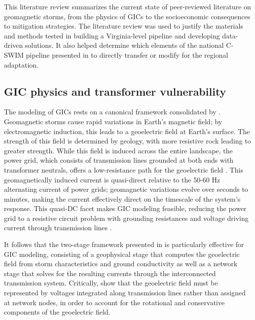 \documentclass[draft]{agujournal2019}
\begin{document}
This literature review summarizes the current state of peer-reviewed literature on geomagnetic storms, from the physics of GICs to the socioeconomic consequences to mitigation strategies. The literature review was used to justify the materials and methods tested in building a Virginia-level pipeline and developing data-driven solutions. It also helped determine which elements of the national C-SWIM pipeline presented in  to directly transfer or modify for the regional adaptation. 

\subsection{GIC physics and transformer vulnerability}

The modeling of GICs rests on a canonical framework consolidated by . Geomagnetic storms cause rapid variations in Earth's magnetic field; by electromagnetic induction, this leads to a geoelectric field at Earth's surface. The strength of this field is determined by geology, with more resistive rock leading to greater strength. While this field is induced across the entire landscape, the power grid, which consists of transmission lines grounded at both ends with transformer neutrals, offers a low-resistance path for the geoelectric field \cite{BotelerGIC}. This geomagnetically induced current is quasi-direct relative to the 50-60 Hz alternating current of power grids; geomagnetic variations evolve over seconds to minutes, making the current effectively direct on the timescale of the system's response. This quasi-DC facet makes GIC modeling feasible, reducing the power grid to a resistive circuit problem with grounding resistances and voltage driving current through transmission lines \cite{BotelerGIC}. 

It follows that the two-stage framework presented in  is particularly effective for GIC modeling, consisting of a geophysical stage that computes the geoelectric field from storm characteristics and ground conductivity as well as a network stage that solves for the resulting currents through the interconnected transmission system. Critically,  show that the geoelectric field must be represented by voltages integrated along transmission lines rather than assigned at network nodes, in order to account for the rotational and conservative components of the geoelectric field. 
\end{document}
